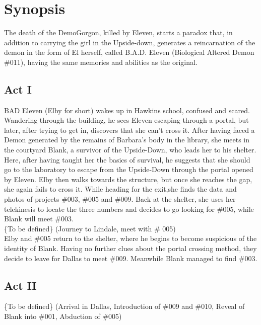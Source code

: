 \section{Synopsis}

The death of the DemoGorgon, killed by Eleven, starts a paradox that, in addition to carrying the girl in the Upside-down, generates a reincarnation of 
the demon in the form of El herself, called B.A.D. Eleven (Biological Altered Demon \#011), having the same memories and abilities as the original.

\subsection{Act I}
BAD Eleven (Elby for short) wakes up in Hawkins school, confused and scared. Wandering through the building, he sees Eleven escaping through a portal, 
but later, after trying to get in, discovers that she can't cross it. After having faced a Demon generated by the remains of Barbara's body in the library, she meets in the courtyard Blank, a survivor of the Upside-Down, who leads her to his shelter. Here, after having taught her the basics of survival, he suggests that she should go to the laboratory to escape from the Upside-Down through the portal opened by Eleven. Elby then walks towards the structure, but once she reaches the gap, she again fails to cross it. While heading for the exit,she finds the data and photos of projects \#003, \#005 and \#009. Back at the shelter, she uses her telekinesis to locate the three numbers and decides to go looking for \#005, while Blank will meet \#003.\\

\{To be defined\} (Journey to Lindale, meet with \# 005)\\

Elby and \#005 return to the shelter, where he begins to become suspicious of the identity of Blank. Having no further clues about the portal 
crossing method, they decide to leave for Dallas to meet \#009. Meanwhile Blank managed to find \#003.

\subsection{Act II}
\{To be defined\} (Arrival in Dallas, Introduction of \#009 and \#010, Reveal of Blank into \#001, Abduction of \#005)\\

